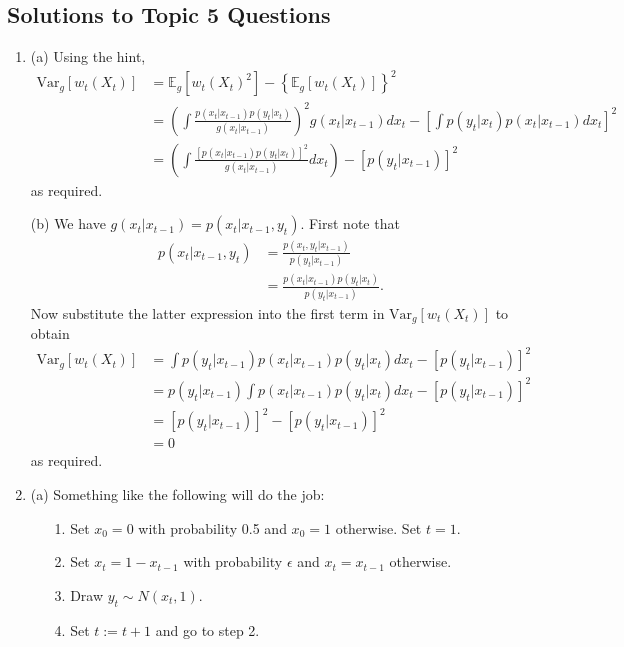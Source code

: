 \documentclass[12pt,BCOR2mm,DIV14,english]{scrreprt}
\theoremstyle{exmp}
\newcommand{\E}{\mathbb{E}}
\newcommand{\V}{\mathrm{Var}}
\begin{document}
\subsection*{Solutions to Topic 5 Questions}
\begin{enumerate}
\item 

(a) Using the hint,
\begin{align*}
\V_g[w_t(X_t)]&= \E_g[w_t(X_t)^2]-\left\{\E_g[w_t(X_t)] \right\}^2\\
&=\left(\int \frac{p(x_t|x_{t-1})p(y_t|x_t)}{g(x_t|x_{t-1})} \right)^2 g(x_t|x_{t-1})dx_t - \left[\int p(y_t|x_t)p(x_t|x_{t-1})dx_t\right]^2\\
&=\left(\int \frac{[p(x_t|x_{t-1})p(y_t|x_t)]^2}{g(x_t|x_{t-1})}dx_t   \right) - [p(y_t|x_{t-1})]^2
\end{align*}
as required.

(b) We have $g(x_t|x_{t-1})=p(x_t|x_{t-1},y_t)$. First note that
\begin{align*}
p(x_t|x_{t-1},y_t)&= \frac{p(x_t,y_t|x_{t-1})}{p(y_t|x_{t-1})}\\
&=\frac{p(x_t|x_{t-1})p(y_t|x_t)}{p(y_t|x_{t-1})}.
\end{align*}
Now substitute the latter expression into the first term in $\V_g[w_t(X_t)]$ to obtain 
\begin{align*}
\V_g[w_t(X_t)]&=\int p(y_t|x_{t-1}) p(x_t|x_{t-1})p(y_t|x_t)dx_t - [p(y_t|x_{t-1})]^2\\
&=p(y_t|x_{t-1})\int p(x_t|x_{t-1})p(y_t|x_t)dx_t - [p(y_t|x_{t-1})]^2\\
&=[p(y_t|x_{t-1})]^2 - [p(y_t|x_{t-1})]^2\\
&=0
\end{align*}
as required.

\item 

(a) Something like the following will do the job:
\begin{enumerate}
\item[1.] Set $x_0=0$ with probability 0.5 and $x_0=1$ otherwise. Set $t=1$.
\item[2.] Set $x_t=1-x_{t-1}$ with probability $\epsilon$ and $x_t=x_{t-1}$ otherwise. 
\item[3.] Draw $y_t\sim N(x_t,1)$.
\item[4.] Set $t:=t+1$ and go to step 2. 
\end{enumerate}


\end{enumerate}
\end{document}
